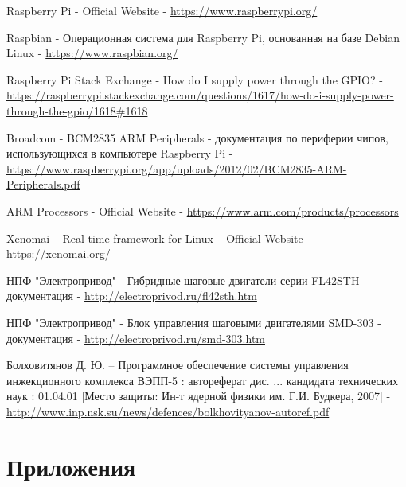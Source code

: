 \documentclass[14pt,russian,a4paper]{extarticle}
\begin{document}
\begin{thebibliography}{99}
Raspberry Pi - Official Website -
\url{https://www.raspberrypi.org/}

Raspbian -
Операционная система для Raspberry Pi, основанная на базе Debian Linux -
\url{https://www.raspbian.org/}

Raspberry Pi Stack Exchange -
How do I supply power through the GPIO? -
\url{https://raspberrypi.stackexchange.com/questions/1617/how-do-i-supply-power-through-the-gpio/1618#1618}

Broadcom -
BCM2835 ARM Peripherals -
документация по периферии чипов, использующихся в компьютере Raspberry Pi -
\url{https://www.raspberrypi.org/app/uploads/2012/02/BCM2835-ARM-Peripherals.pdf}

ARM Processors -
Official Website -
\url{https://www.arm.com/products/processors}

Xenomai – Real-time framework for Linux –
Official Website -
\url{https://xenomai.org/}

НПФ "Электропривод" -
Гибридные шаговые двигатели серии FL42STH -
документация -
\url{http://electroprivod.ru/fl42sth.htm}

НПФ "Электропривод" -
Блок управления шаговыми двигателями SMD-303 -
документация -
\url{http://electroprivod.ru/smd-303.htm}

Болховитянов Д. Ю. –
Программное обеспечение системы управления инжекционного комплекса ВЭПП-5 :
автореферат дис. ... кандидата технических наук :
01.04.01 [Место защиты: Ин-т ядерной физики им. Г.И. Будкера, 2007] -
\url{http://www.inp.nsk.su/news/defences/bolkhovityanov-autoref.pdf}

\end{thebibliography}

\newpage

\section{Приложения}
\end{document}
